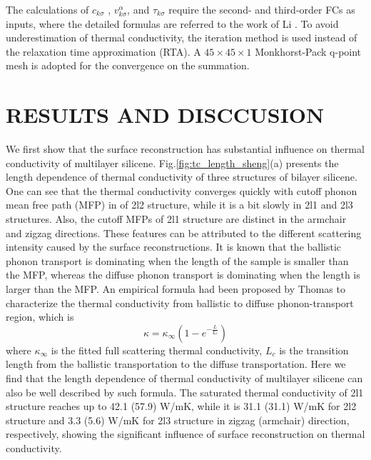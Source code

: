 \documentclass[aps,prb,twocolumn,showpacs,amsmath,amssymb]{revtex4-1}
\begin{document}
The calculations of $c_{k\sigma}$ , $v_{k \sigma}^{\alpha}$, and $\tau_{k\sigma}$ require the second- and third-order FCs as inputs, where the detailed formulas are referred to the work of  Li \cite{Li2014}. To avoid underestimation of thermal conductivity, the iteration method is used instead of the relaxation time approximation (RTA). A $45\times 45 \times 1$ Monkhorst-Pack q-point mesh is adopted for the convergence on the summation.

\section{RESULTS AND DISCCUSION}

We first show that the surface reconstruction has substantial influence on thermal conductivity of multilayer silicene.
Fig.\ref{fig:tc_length_sheng}(a) presents the length dependence of thermal conductivity of three structures of bilayer silicene.
One can see that the thermal conductivity converges quickly with cutoff phonon mean free path (MFP) in of 2l2 structure, while it is a bit slowly in 2l1 and 2l3 structures. Also, the cutoff MFPs of 2l1 structure are distinct in the armchair and zigzag directions. These features can be attributed to the different scattering intensity caused by the surface reconstructions.
It is known that the ballistic phonon transport is dominating when the length of the sample is smaller than the MFP,  whereas the diffuse phonon transport is  dominating when the length is larger than the MFP.
An empirical formula had been proposed by Thomas\cite{Thomas2010}  to characterize the thermal conductivity from ballistic to diffuse phonon-transport region, which is
\begin{equation}
  \kappa = \kappa_\infty (1-e^{-\frac{L}{L_c}}) \label{eq:eq_nemd}
\end{equation}
where $\kappa_\infty$ is the fitted full scattering thermal conductivity, $L_c$ is the transition length from the ballistic transportation to the diffuse transportation. Here we find that the length dependence of thermal conductivity of multilayer silicene can also be well described by such formula.
The saturated thermal conductivity of 2l1 structure reaches up to 42.1 (57.9) W/mK, while it is  31.1 (31.1) W/mK  for 2l2 structure and  3.3 (5.6)  W/mK for 2l3 structure in zigzag (armchair) direction, respectively,  showing the significant influence of surface reconstruction on thermal conductivity.
\end{document}
